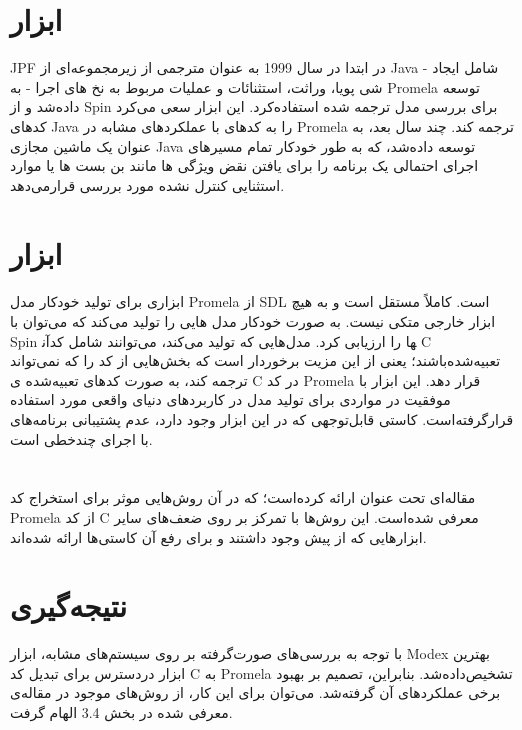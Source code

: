 \section{ابزار }
JPF \cite{3} در ابتدا در سال 1999 به عنوان مترجمی از زیرمجموعه‌ای از Java - شامل ایجاد شی پویا، وراثت، استثنائات و عملیات مربوط به نخ های اجرا - به Promela توسعه داده‌شد و از Spin برای بررسی مدل ترجمه شده استفاده‌کرد. این ابزار سعی می‌کرد کدهای Java را به کدهای با عملکردهای مشابه در Promela ترجمه کند. چند سال بعد، به عنوان یک ماشین مجازی Java  توسعه داده‌شد، که به طور خودکار تمام مسیرهای اجرای احتمالی یک برنامه را برای یافتن نقض ویژگی ها  مانند بن بست  ها یا موارد استثنایی کنترل نشده  مورد بررسی قرار‌می‌دهد.

\section{ابزار }
 \cite{5} ابزاری برای تولید خودکار مدل Promela از SDL است. کاملاً مستقل است و به هیچ ابزار خارجی متکی نیست. به صورت خودکار مدل هایی را تولید می‌کند که می‌توان با Spin آن‎ها را ارزیابی کرد. مدل‌هایی که تولید می‌کند، می‌توانند شامل کد C تعبیه‌شده‌باشند؛ یعنی از این مزیت برخوردار است که بخش‌هایی از کد را که نمی‌تواند ترجمه کند، به صورت کدهای تعبیه‌شده ی C در کد Promela قرار دهد. این ابزار با موفقیت در مواردی برای تولید مدل در کاربردهای دنیای واقعی مورد استفاده قرار‌گرفته‌است. کاستی قابل‌توجهی که در این ابزار وجود دارد، عدم پشتیبانی برنامه‌های با اجرای چندخطی  است. 


\section{}
 مقاله‌ای تحت عنوان  \cite{6} ارائه کرده‌است؛ که در آن روش‌هایی موثر برای استخراج کد Promela از کد C معرفی شده‌‌است. این روش‌ها با تمرکز بر روی ضعف‌های سایر ابزارهایی که از پیش وجود داشتند و برای رفع آن کاستی‌ها ارائه شده‌اند. 


\section{نتیجه‌گیری}
با توجه به بررسی‌های صورت‌گرفته بر روی سیستم‌های مشابه، ابزار Modex بهترین ابزار دردسترس برای تبدیل کد C به Promela تشخیص‌داده‌شد. بنابراین، تصمیم بر بهبود برخی عملکردهای آن گرفته‌شد. می‌توان برای این کار، از روش‌های موجود در مقاله‌ی معرفی شده در بخش 3.4 الهام گرفت.
